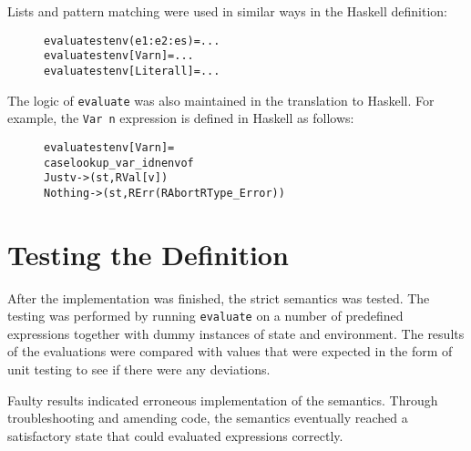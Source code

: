 \noindent Lists and pattern matching were used in similar ways in the Haskell definition:

\begin{figure}[H]
\begin{alltt}
  evaluate st env (e1:e2:es)  = ...
  evaluate st env [Var n]     = ...
  evaluate st env [Literal l] = ...
\end{alltt}
\end{figure}

\noindent The logic of \texttt{evaluate} was also maintained in the translation
to Haskell. For example, the \texttt{Var n} expression is defined in Haskell as
follows:

\begin{figure}[H]
\begin{alltt}
  evaluate st env [Var n] =
    case lookup_var_id n env of
      Just v  -> (st, RVal [v])
      Nothing -> (st, RErr (RAbort RType_Error))
\end{alltt}
\end{figure}

\section{Testing the Definition}

After the implementation was finished, the strict semantics was tested.
The testing was performed by running \texttt{evaluate} on a number of predefined
expressions together with dummy instances of state and environment.
The results of the evaluations were compared with values that were expected
in the form of unit testing to see if there were any deviations. 

Faulty results indicated erroneous implementation of the semantics.
Through troubleshooting and amending code, the semantics eventually
reached a satisfactory state that could evaluated expressions correctly.

